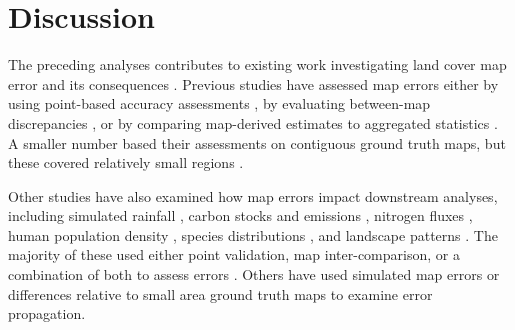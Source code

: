 \documentclass[12 pt, titlepage, a4paper]{article}
\begin{document}
\vspace{-0.5 cm}
\section*{Discussion}
\vspace{-0.2 cm}

The preceding analyses contributes to existing work investigating land cover map error and its consequences \citep[e.g.][]{fritz_highlighting_2011,verburg_challenges_2011,olofsson_making_2013}. Previous studies have assessed map errors either by using point-based accuracy assessments \citep[e.g.][]{olofsson_making_2013,frey_how_2007,foody_status_2002}, by evaluating between-map discrepancies \citep[e.g.][]{fritz_highlighting_2011,fritz_identifying_2008,fritz_comparison_2010}, or by comparing map-derived estimates to aggregated statistics \citep[e.g.][]{larsen_taken_2015,fritz_comparison_2010,yu_meta-discoveries_2014}. A smaller number based their assessments on contiguous ground truth maps, but these covered relatively small regions \cite[$<$3000 km$^2$, or $<$0.03\% of the area covered here;][]{dendoncker_exploring_2008,schmit_limitations_2006}.

Other studies have also examined how map errors impact downstream analyses, including simulated rainfall \citep{ge_impacts_2007}, carbon stocks and emissions \citep{goetz_mapping_2009, quaife_impact_2008, olofsson_making_2013,jain_co2_2013}, nitrogen fluxes \citep{jain_co2_2013,nol_effect_2008}, human population density \citep{linard_assessing_2010}, species distributions \citep{tuanmu_global_2014}, and landscape patterns \citep{langford_map_2006}. The majority of these used either point validation, map inter-comparison, or a combination of both to assess errors \citep{goetz_mapping_2009, olofsson_making_2013, jain_co2_2013, linard_assessing_2010, quaife_impact_2008,tuanmu_global_2014}. Others have used simulated map errors \citep{ge_impacts_2007,langford_map_2006} or differences relative to small area ground truth maps \citep[$<$1000 m;][]{nol_effect_2008} to examine error propagation.
\end{document}
